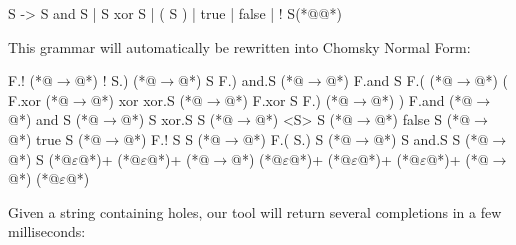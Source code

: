 \documentclass[runningheads]{llncs}
\begin{document}
\begin{wholetidyinput}
  S -> S and S | S xor S | ( S ) | true | false | ! S(*@\caret{ }@*)
\end{wholetidyinput}

\noindent This grammar will automatically be rewritten into Chomsky Normal Form:

\begin{wholetidyinput}
 F.! (*@$\rightarrow$@*) !        S.) (*@$\rightarrow$@*) S F.)     and.S (*@$\rightarrow$@*) F.and S
F.( (*@$\rightarrow$@*) (      F.xor (*@$\rightarrow$@*) xor       xor.S (*@$\rightarrow$@*) F.xor S
F.) (*@$\rightarrow$@*) )      F.and (*@$\rightarrow$@*) and           S (*@$\rightarrow$@*) S xor.S
  S (*@$\rightarrow$@*) <S>        S (*@$\rightarrow$@*) false         S (*@$\rightarrow$@*) true
  S (*@$\rightarrow$@*) F.! S      S (*@$\rightarrow$@*) F.( S.)       S (*@$\rightarrow$@*) S and.S
  S (*@$\rightarrow$@*) S (*@$\varepsilon$@*)+      (*@$\varepsilon$@*)+ (*@$\rightarrow$@*) (*@$\varepsilon$@*)+ (*@$\varepsilon$@*)+         (*@$\varepsilon$@*)+ (*@$\rightarrow$@*) (*@$\varepsilon$@*)
\end{wholetidyinput}

%

\noindent Given a string containing holes, our tool will return several completions in a few milliseconds:
\end{document}
